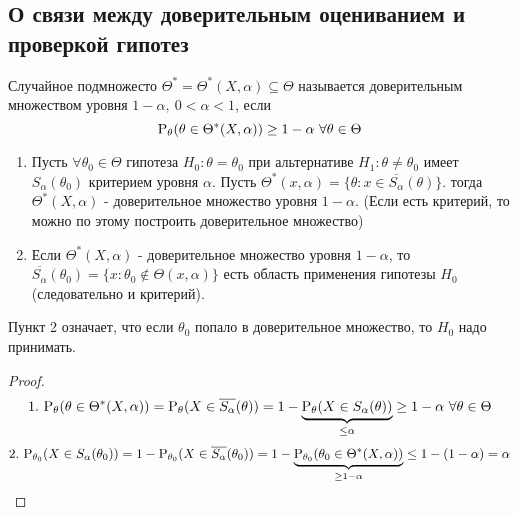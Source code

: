 \subsection*{О связи между доверительным оцениванием и проверкой гипотез}

\begin{definition}
    Случайное подмножесто \(\Theta^*=\Theta^*(X,\alpha)\subseteq\Theta\)
    называется доверительным множеством уровня \(1-\alpha,\ 0<\alpha<1\),
    если
    \[\P_\theta(\theta\in\Theta^*(X,\alpha))\geq 1-\alpha\ \forall\theta\in\Theta\]
\end{definition}
\begin{theorem} \label{th::trusted_set_eq_plausibility_test}
    \begin{enumerate}
        \item Пусть \(\forall\theta_0\in\Theta\) гипотеза \(H_0:\theta=\theta_0\)
        при альтернативе \(H_1:\theta\neq\theta_0\) имеет \(S_\alpha(\theta_0)\)
        критерием уровня \(\alpha\). Пусть \(\Theta^*(x,\alpha) = \{\theta:x\in\overline{S_\alpha}(\theta)\}\).
        тогда \(\Theta^*(X,\alpha)\) - доверительное множество уровня \(1-\alpha\).
        (Если есть критерий, то можно по этому  построить доверительное множество)

        \item Если \(\Theta^*(X,\alpha)\) - доверительное множество уровня \(1-\alpha\),
        то \(\overline{S_\alpha}(\theta_0)=\{x:\theta_0\notin\Theta(x,\alpha)\}\)
        есть область применения гипотезы \(H_0\) (следовательно и критерий).
    \end{enumerate}
\end{theorem}
\begin{remark} \label{hyp::accept_HO}
    Пункт 2 означает, что если \(\theta_0\) попало в доверительное множество,
    то \(H_0\) надо принимать.
\end{remark}
\begin{proof}
    \[1.\ \P_\theta(\theta\in\Theta^*(X,\alpha)) = \P_\theta(X\in\overline{S_\alpha}(\theta)) = 1 - \underbrace{\P_\theta(X\in S_\alpha(\theta))}_{\leq\alpha}\geq 1-\alpha\ \forall\theta\in\Theta\]
    \[2.\ \P_{\theta_0}(X\in S_\alpha(\theta_0)) = 1-\P_{\theta_0}(X\in \overline{S_\alpha}(\theta_0))=
        1-\underbrace{\P_{\theta_0}(\theta_0\in\Theta^*(X,\alpha))}_{\geq 1-\alpha} \leq 1-(1-\alpha) = \alpha\]
\end{proof}
